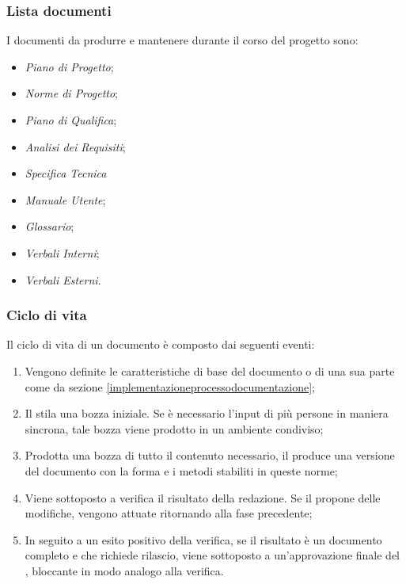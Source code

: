 \subsubsection{Lista documenti}
\par I documenti da produrre e mantenere durante il corso del progetto sono:
\begin{itemize}
  \item \emph{Piano di Progetto};
  \item \emph{Norme di Progetto};
  \item \emph{Piano di Qualifica};
  \item \emph{Analisi dei Requisiti};
  \item \emph{Specifica Tecnica}
  \item \emph{Manuale Utente};
  \item \emph{Glossario};
  \item \emph{Verbali Interni};
  \item \emph{Verbali Esterni}.
\end{itemize}

\subsubsection{Ciclo di vita}
\par Il ciclo di vita di un documento è composto dai seguenti eventi:
\begin{enumerate}
  \item Vengono definite le caratteristiche di base del documento o di una sua parte come da sezione \ref{implementazioneprocessodocumentazione};
  \item Il \Redattore{} stila una bozza iniziale. Se è necessario l'input di più persone in maniera sincrona, tale bozza viene prodotto in un ambiente condiviso;
  \item Prodotta una bozza di tutto il contenuto necessario, il \Redattore{} produce una versione del documento con la forma e i metodi stabiliti in queste norme;
  \item Viene sottoposto a verifica il risultato della redazione. Se il \Verificatore{} propone delle modifiche, vengono attuate ritornando alla fase precedente;
  \item In seguito a un esito positivo della verifica, se il risultato è un documento completo e che richiede rilascio, viene sottoposto a un'approvazione finale del \Responsabile{}, bloccante in modo analogo alla verifica.
\end{enumerate}

